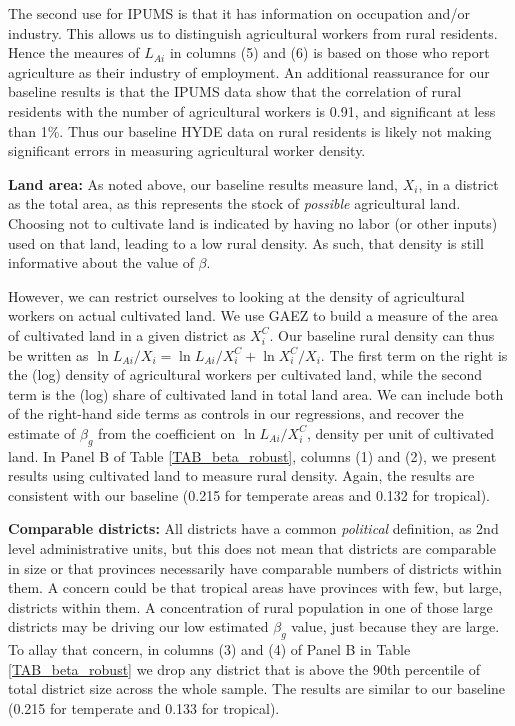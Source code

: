 \documentclass[11pt]{article}
\begin{document}
The second use for IPUMS is that it has information on occupation and/or industry. This allows us to distinguish agricultural workers from rural residents. Hence the meaures of $L_{Ai}$ in columns (5) and (6) is based on those who report agriculture as their industry of employment. An additional reassurance for our baseline results is that the IPUMS data show that the correlation of rural residents with the number of agricultural workers is 0.91, and significant at less than 1\%. Thus our baseline HYDE data on rural residents is likely not making significant errors in measuring agricultural worker density.

\vspace{.5cm}\noindent\textbf{Land area:} As noted above, our baseline results measure land, $X_i$, in a district as the total area, as this represents the stock of \textit{possible} agricultural land. Choosing not to cultivate land is indicated by having no labor (or other inputs) used on that land, leading to a low rural density. As such, that density is still informative about the value of $\beta$.

However, we can restrict ourselves to looking at the density of agricultural workers on actual cultivated land. We use GAEZ to build a measure of the area of cultivated land in a given district as $X^C_i$. Our baseline rural density can thus be written as $\ln L_{Ai}/X_i = \ln L_{Ai}/X_i^C + \ln X_i^C/X_i$. The first term on the right is the (log) density of agricultural workers per cultivated land, while the second term is the (log) share of cultivated land in total land area. We can include both of the right-hand side terms as controls in our regressions, and recover the estimate of $\beta_g$ from the coefficient on $\ln L_{Ai}/X_i^C$, density per unit of cultivated land. In Panel B of Table \ref{TAB_beta_robust}, columns (1) and (2), we present results using cultivated land to measure rural density. Again, the results are consistent with our baseline (0.215 for temperate areas and 0.132 for tropical). 

\vspace{.5cm}\noindent\textbf{Comparable districts:} All districts have a common \textit{political} definition, as 2nd level administrative units, but this does not mean that districts are comparable in size or that provinces necessarily have comparable numbers of districts within them. A concern could be that tropical areas have provinces with few, but large, districts within them. A concentration of rural population in one of those large districts may be driving our low estimated $\beta_g$ value, just because they are large. To allay that concern, in columns (3) and (4) of Panel B in Table \ref{TAB_beta_robust} we drop any district that is above the 90th percentile of total district size across the whole sample. The results are similar to our baseline (0.215 for temperate and 0.133 for tropical). 
\end{document}
